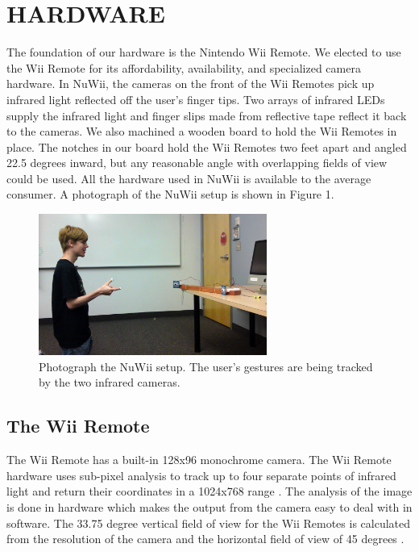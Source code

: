 \documentclass[a4paper,twoside]{article}
\begin{document}
\section{\uppercase{Hardware}}
\noindent The foundation of our hardware is the Nintendo Wii Remote. We elected to use the Wii Remote for its affordability, availability, and specialized camera hardware. In NuWii, the cameras on the front of the Wii Remotes pick up infrared light reflected off the user's finger tips. Two arrays of infrared LEDs supply the infrared light and finger slips made from reflective tape reflect it back to the cameras.  We also machined a wooden board to hold the Wii Remotes in place. The notches in our board hold the Wii Remotes two feet apart and angled 22.5 degrees inward, but any reasonable angle with overlapping fields of view could be used. All the hardware used in NuWii is available to the average consumer. A photograph of the NuWii setup is shown in Figure 1.
 
\begin{figure}[h]
\begin{center}
\includegraphics[width = 7.5cm]{setup}
\end{center}
\caption{Photograph the NuWii setup. The user's gestures are being tracked by the two infrared cameras.}
\label{setup}
\end{figure}
 
\subsection{The Wii Remote}
The Wii Remote has a built-in 128x96 monochrome camera. The Wii Remote hardware uses sub-pixel analysis to track up to four separate points of infrared light and return their coordinates in a 1024x768 range \cite{WiiBrew10}. The analysis of the image is done in hardware which makes the output from the camera easy to deal with in software. The 33.75 degree vertical field of view for the Wii Remotes is calculated from the resolution of the camera and the horizontal field of view of 45 degrees \cite{Lee08}.
\end{document}

